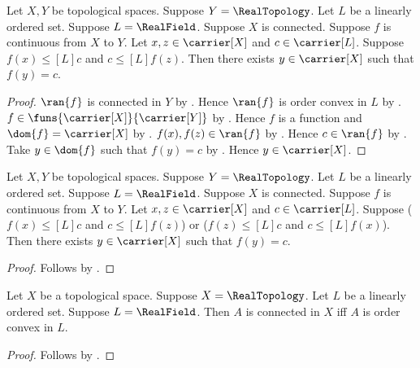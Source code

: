 \begin{theorem}\label{continuous_real_map_intermediate_value_ordered}
    Let $X,Y$ be topological spaces.
    Suppose $Y=\RealTopology$.
    Let $L$ be a linearly ordered set.
    Suppose $L=\RealField$.
    Suppose $X$ is connected.
    Suppose $f$ is continuous from $X$ to $Y$.
    Let $x,z\in\carrier[X]$ and $c\in\carrier[L]$.
    Suppose $f(x)\mathrel{\leq[L]}c$ and
        $c\mathrel{\leq[L]}f(z)$.
    Then there exists $y\in\carrier[X]$ such that $f(y)=c$.
\end{theorem}
\begin{proof}
    $\ran{f}$ is connected in $Y$ by
        .
    Hence $\ran{f}$ is order convex in $L$ by
        .
    $f\in\funs{\carrier[X]}{\carrier[Y]}$ by
        .
    Hence $f$ is a function and $\dom{f}=\carrier[X]$ by
        .
    $f(x),f(z)\in\ran{f}$ by .
    Hence $c\in\ran{f}$ by .
    Take $y\in\dom{f}$ such that $f(y)=c$ by
        .
    Hence $y\in\carrier[X]$.
\end{proof}

\begin{theorem}\label{continuous_real_map_intermediate_value}
    Let $X,Y$ be topological spaces.
    Suppose $Y=\RealTopology$.
    Let $L$ be a linearly ordered set.
    Suppose $L=\RealField$.
    Suppose $X$ is connected.
    Suppose $f$ is continuous from $X$ to $Y$.
    Let $x,z\in\carrier[X]$ and $c\in\carrier[L]$.
    Suppose
        ($f(x)\mathrel{\leq[L]}c$ and
            $c\mathrel{\leq[L]}f(z)$) or
        ($f(z)\mathrel{\leq[L]}c$ and
            $c\mathrel{\leq[L]}f(x)$).
    Then there exists $y\in\carrier[X]$ such that $f(y)=c$.
\end{theorem}
\begin{proof}
    Follows by
        .
\end{proof}

\begin{corollary}\label{real_connected_iff_order_convex}
    Let $X$ be a topological space.
    Suppose $X=\RealTopology$.
    Let $L$ be a linearly ordered set.
    Suppose $L=\RealField$.
    Then $A$ is connected in $X$ iff $A$ is order convex in $L$.
\end{corollary}
\begin{proof}
    Follows by
        .
\end{proof}

